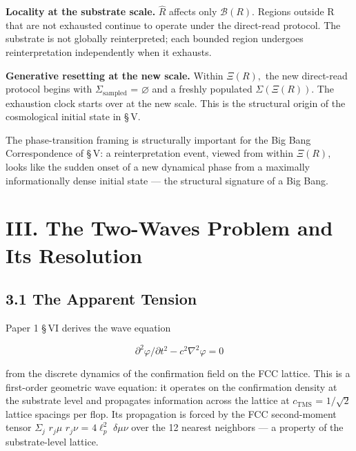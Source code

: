 \documentclass[11pt,oneside]{report}
\theoremstyle{definition}
\theoremstyle{remark}
\begin{document}
\textbf{Locality at the substrate scale.} \ensuremath{\hat{R}} affects only \ensuremath{\mathcal{B}(R).} Regions
outside R that are not exhausted continue to operate under the
direct-read protocol. The substrate is not globally reinterpreted; each
bounded region undergoes reinterpretation independently when it
exhausts.

\textbf{Generative resetting at the new scale.} Within \ensuremath{\Xi (R),} the new
direct-read protocol begins with \ensuremath{\Sigma_{\mathrm{sampled}}} = \ensuremath{\varnothing} and a freshly populated
\ensuremath{\Sigma (\Xi (R)).} The exhaustion clock starts over at the new scale. This is the
structural origin of the cosmological initial state in \S\,V.

The phase-transition framing is structurally important for the Big Bang
Correspondence of \S\,V: a reinterpretation event, viewed from within \ensuremath{\Xi (R),}
looks like the sudden onset of a new dynamical phase from a maximally
informationally dense initial state --- the structural signature of a
Big Bang.

\section*{III. The Two-Waves Problem and Its Resolution}

\subsection*{3.1 The Apparent Tension}

Paper 1 \S\,VI derives the wave equation

\begin{equation*}
\partial ^{2}\varphi / \partial t^{2} - c^{2}\nabla ^{2}\varphi = 0
\end{equation*}

from the discrete dynamics of the confirmation field on the FCC lattice.
This is a first-order geometric wave equation: it operates on the
confirmation density at the substrate level and propagates information
across the lattice at \ensuremath{c_{\mathrm{TMS}}} = \ensuremath{1/\sqrt{2}} lattice spacings per flop. Its
propagation is forced by the FCC second-moment tensor \ensuremath{\Sigma_{j}} \ensuremath{r_{j}\mu} \ensuremath{r_{j}\nu} = \ensuremath{4\ell^{2}_{p}}
\ensuremath{\delta \mu \nu} over the 12 nearest neighbors --- a property of the substrate-level
lattice.
\end{document}
